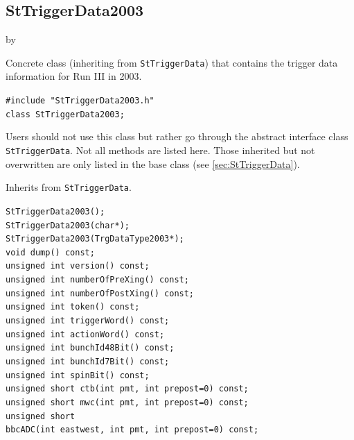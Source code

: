 \documentclass[twoside]{article}
\newcommand{\entrylabel}[1]{\mbox{\textbf{{#1}}}\hfil}%
\newenvironment{entry}
{\begin{list}{}%
    {\renewcommand{\makelabel}{\entrylabel}%
     \setlength{\labelwidth}{90pt}%
     \setlength{\leftmargin}{\labelwidth}
     \advance\leftmargin by \labelsep%
      }%
    }%
  {\end{list}}
\newcommand{\Entrylabel}[1]%
{\raisebox{0pt}[1ex][0pt]{\makebox[\labelwidth][l]%
    {\parbox[t]{\labelwidth}{\hspace{0pt}\textbf{{#1}}}}}}
\newenvironment{Entry}%
{\renewcommand{\entrylabel}{\Entrylabel}\begin{entry}}%
  {\end{entry}}
\begin{document}
\subsection{StTriggerData2003}
\label{sec:StTriggerData2003}
\begin{Entry}
\item[Summary] Concrete class (inheriting from \texttt{StTriggerData}) that contains
    the trigger data information for Run III in 2003. 
\item[Synopsis]
    \verb+#include "StTriggerData2003.h"+\\
    \verb+class StTriggerData2003;+\\
\item[Description] Users should not use this class but rather go through the
    abstract interface class \texttt{StTriggerData}. Not all methods are listed here.
    Those inherited but not overwritten are only listed in the base class (see \ref{sec:StTriggerData}).
\item[Related Classes] Inherits from \texttt{StTriggerData}.
\item[Public\\ Constructors]
    \verb+StTriggerData2003();+\\
    \verb+StTriggerData2003(char*);+\\
    \verb+StTriggerData2003(TrgDataType2003*);+\\
    \verb+void dump() const;+\\
    \verb+unsigned int version() const; +\\
    \verb+unsigned int numberOfPreXing() const; +\\
    \verb+unsigned int numberOfPostXing() const; +\\
    \verb+unsigned int token() const;+\\
    \verb+unsigned int triggerWord() const;+\\
    \verb+unsigned int actionWord() const; +\\
    \verb+unsigned int bunchId48Bit() const;+\\
    \verb+unsigned int bunchId7Bit() const;+\\
    \verb+unsigned int spinBit() const;+\\
    \verb+unsigned short ctb(int pmt, int prepost=0) const;+\\
    \verb+unsigned short mwc(int pmt, int prepost=0) const;+\\

    \verb+unsigned short+\\
    \verb+bbcADC(int eastwest, int pmt, int prepost=0) const;+\\


\end{Entry}
\end{document}

